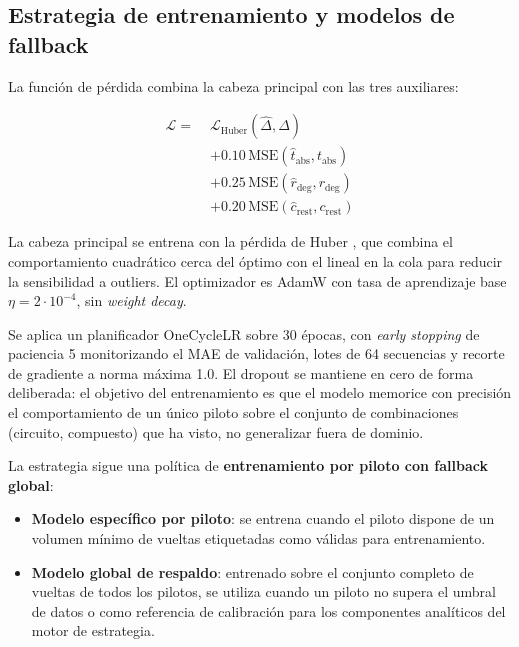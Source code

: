 \subsection{Estrategia de entrenamiento y modelos de fallback}
\label{ssec:entrenamiento_fallback}

La función de pérdida combina la cabeza principal con las tres auxiliares:

\begin{equation}
    \begin{aligned}
        \mathcal{L} =\;& \mathcal{L}_\text{Huber}(\hat{\Delta}, \Delta) \\
        &+ 0.10\,\mathrm{MSE}(\hat{t}_\text{abs}, t_\text{abs}) \\
        &+ 0.25\,\mathrm{MSE}(\hat{r}_\text{deg}, r_\text{deg}) \\
        &+ 0.20\,\mathrm{MSE}(\hat{c}_\text{rest}, c_\text{rest})
    \end{aligned}
    \label{eq:transformer_loss}
\end{equation}

La cabeza principal se entrena con la pérdida de Huber \cite{wikipediahuberloss}, que combina el comportamiento cuadrático cerca del óptimo con el lineal en la cola para reducir la sensibilidad a outliers. El optimizador es AdamW \cite{cornelladamw} con tasa de aprendizaje base $\eta = 2 \cdot 10^{-4}$, sin \textit{weight decay}. 

Se aplica un planificador OneCycleLR \cite{pytorchonecyclelr} sobre 30 épocas, con \textit{early stopping} de paciencia 5 monitorizando el MAE de validación, lotes de 64 secuencias y recorte de gradiente a norma máxima 1.0. El dropout se mantiene en cero de forma deliberada: el objetivo del entrenamiento es que el modelo memorice con precisión el comportamiento de un único piloto sobre el conjunto de combinaciones (circuito, compuesto) que ha visto, no generalizar fuera de dominio.

La estrategia sigue una política de \textbf{entrenamiento por piloto con fallback global}:

\begin{itemize}
    \item \textbf{Modelo específico por piloto}: se entrena cuando el piloto dispone de un volumen mínimo de vueltas etiquetadas como válidas para entrenamiento.
    \item \textbf{Modelo global de respaldo}: entrenado sobre el conjunto completo de vueltas de todos los pilotos, se utiliza cuando un piloto no supera el umbral de datos o como referencia de calibración para los componentes analíticos del motor de estrategia.
\end{itemize}

